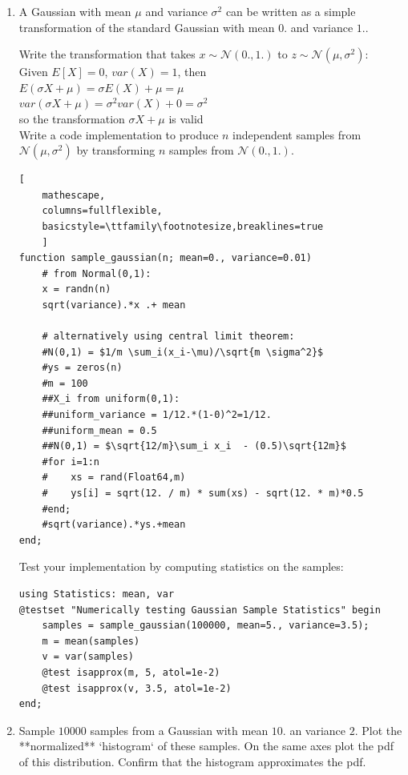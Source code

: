 \documentclass[12pt,letter]{article}
\begin{document}
\begin{enumerate}
    \item A Gaussian with mean $\mu$ and variance $\sigma^2$ can be written as a simple transformation of the standard Gaussian with mean $0.$ and variance $1.$.

      Write the transformation that takes $x \sim \mathcal{N}(0.,1.)$ to $z \sim \mathcal{N}(\mu, \sigma^2)$:\\
      Given $E[X]=0$, $var(X)=1$, then\\
      $E(\sigma X+\mu) = \sigma E(X)+\mu = \mu$\\
      $var(\sigma X+\mu) = \sigma^2 var(X) + 0 = \sigma^2$\\
      so the transformation $\sigma X + \mu$ is valid\\

      Write a code implementation to produce $n$ independent samples from $\mathcal{N}(\mu, \sigma^2)$ by transforming $n$ samples from $\mathcal{N}(0.,1.)$.
\begin{lstlisting}[
    mathescape,
    columns=fullflexible,
    basicstyle=\ttfamily\footnotesize,breaklines=true
    ]
function sample_gaussian(n; mean=0., variance=0.01)
    # from Normal(0,1):
    x = randn(n)
    sqrt(variance).*x .+ mean

    # alternatively using central limit theorem:
    #N(0,1) = $1/m \sum_i(x_i-\mu)/\sqrt{m \sigma^2}$
    #ys = zeros(n)
    #m = 100
    ##X_i from uniform(0,1):
    ##uniform_variance = 1/12.*(1-0)^2=1/12.
    ##uniform_mean = 0.5
    ##N(0,1) = $\sqrt{12/m}\sum_i x_i  - (0.5)\sqrt{12m}$
    #for i=1:n
    #    xs = rand(Float64,m)
    #    ys[i] = sqrt(12. / m) * sum(xs) - sqrt(12. * m)*0.5
    #end;
    #sqrt(variance).*ys.+mean
end;
\end{lstlisting}
      
      Test your implementation by computing statistics on the samples:
\begin{verbatim}
using Statistics: mean, var
@testset "Numerically testing Gaussian Sample Statistics" begin
    samples = sample_gaussian(100000, mean=5., variance=3.5);
    m = mean(samples)
    v = var(samples)
    @test isapprox(m, 5, atol=1e-2)
    @test isapprox(v, 3.5, atol=1e-2)
end;
\end{verbatim}

      \pagebreak
      
    \item Sample $10000$ samples from a Gaussian with mean $10.$ an variance $2$. Plot the **normalized** `histogram` of these samples. On the same axes plot the pdf of this distribution.
Confirm that the histogram approximates the pdf.


\end{enumerate}
\end{document}
